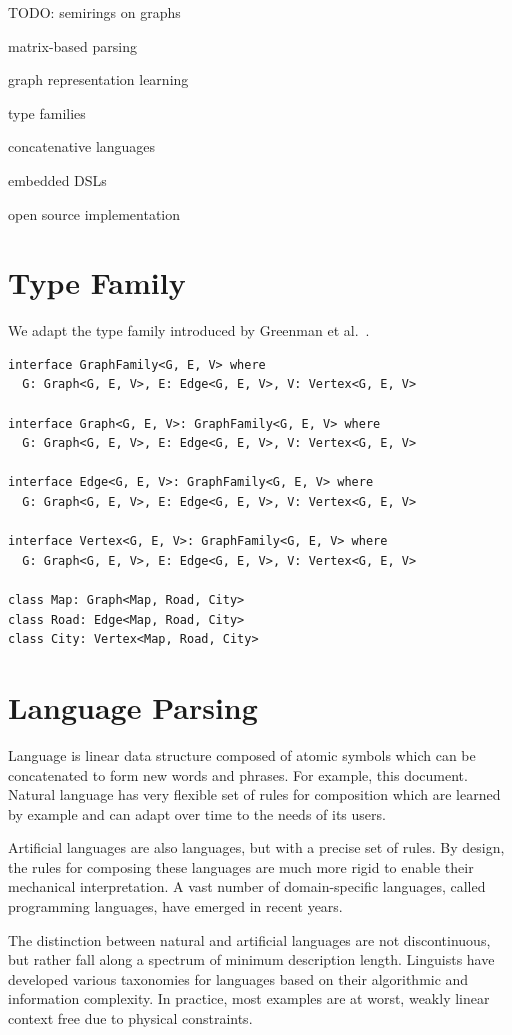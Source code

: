 \documentclass[sigplan,10pt,review,anonymous]{acmart}
\begin{document}
TODO: semirings on graphs

matrix-based parsing

graph representation learning

type families

concatenative languages

embedded DSLs

open source implementation

\section{Type Family}

We adapt the type family introduced by Greenman et al.~\citep{greenman2014getting}.

\begin{lstlisting}
interface GraphFamily<G, E, V> where
  G: Graph<G, E, V>, E: Edge<G, E, V>, V: Vertex<G, E, V>

interface Graph<G, E, V>: GraphFamily<G, E, V> where
  G: Graph<G, E, V>, E: Edge<G, E, V>, V: Vertex<G, E, V>

interface Edge<G, E, V>: GraphFamily<G, E, V> where
  G: Graph<G, E, V>, E: Edge<G, E, V>, V: Vertex<G, E, V>

interface Vertex<G, E, V>: GraphFamily<G, E, V> where
  G: Graph<G, E, V>, E: Edge<G, E, V>, V: Vertex<G, E, V>

class Map: Graph<Map, Road, City>
class Road: Edge<Map, Road, City>
class City: Vertex<Map, Road, City>
\end{lstlisting}

\section{Language Parsing}

Language is linear data structure composed of atomic symbols which can be concatenated to form new words and phrases. For example, this document. Natural language has very flexible set of rules for composition which are learned by example and can adapt over time to the needs of its users.

Artificial languages are also languages, but with a precise set of rules. By design, the rules for composing these languages are much more rigid to enable their mechanical interpretation. A vast number of domain-specific languages, called programming languages, have emerged in recent years.

The distinction between natural and artificial languages are not discontinuous, but rather fall along a spectrum of minimum description length. Linguists have developed various taxonomies for languages based on their algorithmic and information complexity. In practice, most examples are at worst, weakly linear context free due to physical constraints.
\end{document}

